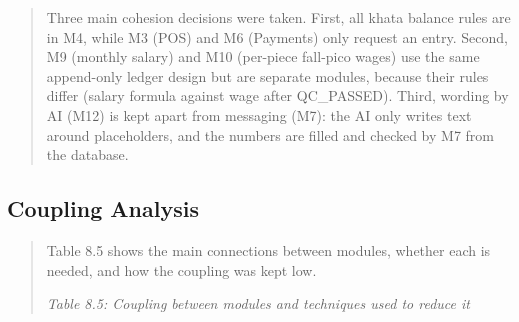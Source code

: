 \documentclass[12pt,a4paper]{article}
\begin{document}
\begin{quote}
Three main cohesion decisions were taken. First, all khata balance rules
are in M4, while M3 (POS) and M6 (Payments) only request an entry.
Second, M9 (monthly salary) and M10 (per-piece fall-pico wages) use the
same append-only ledger design but are separate modules, because their
rules differ (salary formula against wage after QC\_PASSED). Third,
wording by AI (M12) is kept apart from messaging (M7): the AI only
writes text around placeholders, and the numbers are filled and checked
by M7 from the database.
\end{quote}

\subsection{Coupling Analysis}\label{coupling-analysis}

\begin{quote}
Table 8.5 shows the main connections between modules, whether each is
needed, and how the coupling was kept low.

\emph{Table 8.5: Coupling between modules and techniques used to reduce
it}
\end{quote}
\end{document}
